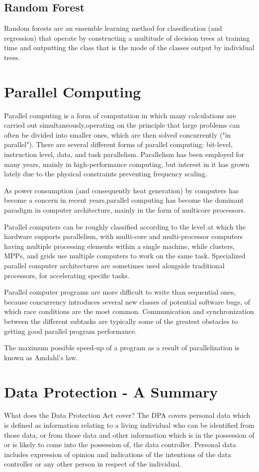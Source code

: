 \documentclass[12pt]{article}
\begin{document}
\subsection{Random Forest}
Random forests are an ensemble learning method for classification (and regression) that operate by constructing a multitude of decision trees at training time and outputting the class that is the mode of the classes output by individual trees. 
\newpage
\section{Parallel Computing}
Parallel computing is a form of computation in which many calculations are carried out simultaneously,operating on the principle that large problems can often be divided into smaller ones, which are then solved concurrently ("in parallel"). There are several different forms of parallel computing: bit-level, instruction level, data, and task parallelism. Parallelism has been employed for many years, mainly in high-performance computing, but interest in it has grown lately due to the physical constraints preventing frequency scaling.

As power consumption (and consequently heat generation) by computers has become a concern in recent years,parallel computing has become the dominant paradigm in computer architecture, mainly in the form of multicore processors.

Parallel computers can be roughly classified according to the level at which the hardware supports parallelism, with multi-core and multi-processor computers having multiple processing elements within a single machine, while clusters, MPPs, and grids use multiple computers to work on the same task. Specialized parallel computer architectures are sometimes used alongside traditional processors, for accelerating specific tasks.

Parallel computer programs are more difficult to write than sequential ones, because concurrency introduces several new classes of potential software bugs, of which race conditions are the most common. Communication and synchronization between the different subtasks are typically some of the greatest obstacles to getting good parallel program performance.

The maximum possible speed-up of a program as a result of parallelization is known as Amdahl's law.

\section{Data Protection - A Summary}
What does the Data Protection Act cover?
The DPA covers personal data which is defined as information relating to a living individual who can be identified from those data, or from those data and other information which is in the possession of or is likely to come into the possession of, the data controller.  Personal data includes expression of opinion and indications of the intentions of the data controller or any other person in respect of the individual.
\end{document}
